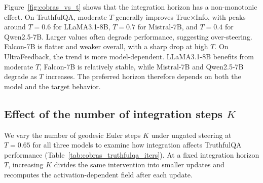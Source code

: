 Figure~\ref{fig:cobras_vs_t} shows that the integration horizon has a non-monotonic effect. On TruthfulQA, moderate $T$ generally improves True$\times$Info, with peaks around $T=0.6$ for LLaMA3.1-8B, $T=0.7$ for Mistral-7B, and $T=0.4$ for Qwen2.5-7B. Larger values often degrade performance, suggesting over-steering. Falcon-7B is flatter and weaker overall, with a sharp drop at high $T$. On UltraFeedback, the trend is more model-dependent. LLaMA3.1-8B benefits from moderate $T$, Falcon-7B is relatively stable, while Mistral-7B and Qwen2.5-7B degrade as $T$ increases. The preferred horizon therefore depends on both the model and the target behavior.

\subsection{Effect of the number of integration steps $K$}
\label{appendix:cobras_vs_k}

We vary the number of geodesic Euler steps $K$ under ungated steering at $T=0.65$ for all three models to examine how integration affects TruthfulQA performance (Table~\ref{tab:cobras_truthfulqa_iters}). At a fixed integration horizon $T$, increasing $K$ divides the same intervention into smaller updates and recomputes the activation-dependent field after each update.

